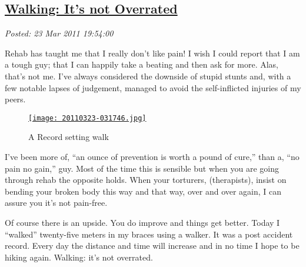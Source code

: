 %

\subsection*{\href{http://bakerjd99.wordpress.com/2011/03/23/walking-its-not-overrated/}{Walking: It's not Overrated}}


\noindent\emph{Posted: 23 Mar 2011 19:54:00}
\vspace{6pt}


Rehab has taught me that I really don't like pain! I wish I could report
that I am a tough guy; that I can happily take a beating and then ask
for more. Alas, that's not me. I've always considered the downside of
stupid stunts and, with a few notable lapses of judgement, managed to
avoid the self-inflicted injuries of my peers.

\captionsetup[figure]{labelformat=empty}
\begin{figure}
\centering
\href{http://conceptcontrol.smugmug.com/Themes/Diaries/SmugShots/16038397_XXJhZx#!i=1241678238&k=74gKFJm&lb=1&s=A}{\texttt{[image: 20110323-031746.jpg]}}
\caption{A Record setting walk}
\label{fig:1207X0}
\end{figure}

I've been more of, ``an ounce of prevention is worth a pound of cure,''
than a, ``no pain no gain,'' guy. Most of the time this is sensible but
when you are going through rehab the opposite holds. When your
torturers, (therapists), insist on bending your broken body this way and
that way, over and over again, I can assure you it's not pain-free.


Of course there is an upside. You do improve and things get better.
Today I ``walked'' twenty-five meters in my braces using a walker. It
was a post accident record. Every day the distance and time will
increase and in no time I hope to be hiking again. Walking: it's not
overrated.

